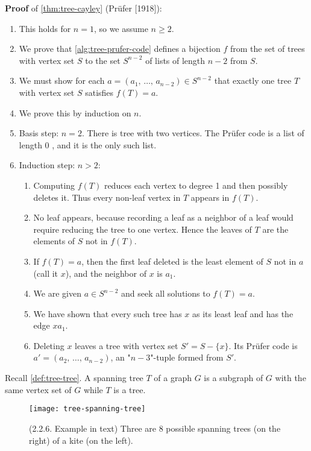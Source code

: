 \documentclass[../src/handouts/main.tex]{subfiles}
\begin{document}
\textbf{Proof} of \cref{thm:tree-cayley} (Prüfer [1918]):
\begin{enumerate}
  \item This holds for $n = 1$, so we assume $n \geq 2$.
  \item We prove that \cref{alg:tree-prufer-code} defines a bijection $f$ from the set of trees with vertex set $S$ to the set $S^{n - 2}$ of lists of length $n - 2$ from $S$.
  \item We must show for each $a = \left(a_1,\, \ldots,\, a_{n - 2}\right) \in S^{n - 2}$ that exactly one tree $T$ with vertex set $S$ satisfies $f(T) = a$.
  \item We prove this by induction on $n$.
  \item Basis step: $n = 2$. There is tree with two vertices. The Prüfer code is a list of length 0 , and it is the only such list.
  \item Induction step: $n > 2$:
    \begin{enumerate}
      \item Computing $f(T)$ reduces each vertex to degree 1 and then possibly deletes it. Thus every non-leaf vertex in $T$ appears in $f(T)$.
      \item No leaf appears, because recording a leaf as a neighbor of a leaf would require reducing the tree to one vertex. Hence the leaves of $T$ are the elements of $S$ not in $f(T)$.
      \item If $f(T) = a$, then the first leaf deleted is the least element of $S$ not in $a$ (call it $x$), and the neighbor of $x$ is $a_1$.
      \item We are given $a \in S^{n - 2}$ and seek all solutions to $f(T)=a$.
      \item We have shown that every such tree has $x$ as its least leaf and has the edge $x a_1$.
      \item Deleting $x$ leaves a tree with vertex set $S' = S - \{x\}$. Its Prüfer code is $a' = \left( a_2,\, \ldots,\, a_{n - 2} \right)$, an "$n - 3$"-tuple formed from $S'$.
    \end{enumerate}
\end{enumerate}

Recall \cref{def:tree-tree}. A spanning tree $T$ of a graph $G$ is a subgraph of $G$ with the same vertex set of $G$ while $T$ is a tree.

\begin{figure}[htbp]
  \centering
  \texttt{[image: tree-spanning-tree]}
  \caption{(2.2.6. Example in text) Three are 8 possible spanning trees (on the right) of a kite (on the left).}
  \label{fig:tree-spanning-tree}
\end{figure}
\end{document}
